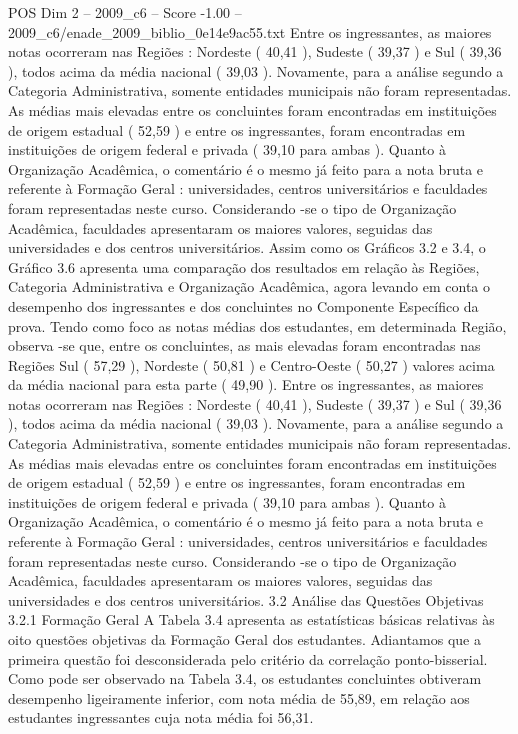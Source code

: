 \begin{textsample}{POS Dim 2 – 2009\_c6 – Score -1.00 – 2009\_c6/enade\_2009\_biblio\_0e14e9ac55.txt}
Entre os ingressantes, as maiores notas ocorreram nas Regiões : Nordeste ( 40,41 ), Sudeste ( 39,37 ) e Sul ( 39,36 ), todos acima da média nacional ( 39,03 ).
Novamente, para a análise segundo a Categoria Administrativa, somente entidades municipais não foram representadas.
As médias mais elevadas entre os concluintes foram encontradas em instituições de origem estadual ( 52,59 ) e entre os ingressantes, foram encontradas em instituições de origem federal e privada ( 39,10 para ambas ).
Quanto à Organização Acadêmica, o comentário é o mesmo já feito para a nota bruta e referente à Formação Geral : universidades, centros universitários e faculdades foram representadas neste curso.
Considerando -se o tipo de Organização Acadêmica, faculdades apresentaram os maiores valores, seguidas das universidades e dos centros universitários.
Assim como os Gráficos 3.2 e 3.4, o Gráfico 3.6 apresenta uma comparação dos resultados em relação às Regiões, Categoria Administrativa e Organização Acadêmica, agora levando em conta o desempenho dos ingressantes e dos concluintes no Componente Específico da prova.
Tendo como foco as notas médias dos estudantes, em determinada Região, observa -se que, entre os concluintes, as mais elevadas foram encontradas nas Regiões Sul ( 57,29 ), Nordeste ( 50,81 ) e Centro-Oeste ( 50,27 ) valores acima da média nacional para esta parte ( 49,90 ).
Entre os ingressantes, as maiores notas ocorreram nas Regiões : Nordeste ( 40,41 ), Sudeste ( 39,37 ) e Sul ( 39,36 ), todos acima da média nacional ( 39,03 ).
Novamente, para a análise segundo a Categoria Administrativa, somente entidades municipais não foram representadas.
As médias mais elevadas entre os concluintes foram encontradas em instituições de origem estadual ( 52,59 ) e entre os ingressantes, foram encontradas em instituições de origem federal e privada ( 39,10 para ambas ).
Quanto à Organização Acadêmica, o comentário é o mesmo já feito para a nota bruta e referente à Formação Geral : universidades, centros universitários e faculdades foram representadas neste curso.
Considerando -se o tipo de Organização Acadêmica, faculdades apresentaram os maiores valores, seguidas das universidades e dos centros universitários. 3.2 Análise das Questões Objetivas 3.2.1 Formação Geral A Tabela 3.4 apresenta as estatísticas básicas relativas às oito questões objetivas da Formação Geral dos estudantes.
Adiantamos que a primeira questão foi desconsiderada pelo critério da correlação ponto-bisserial.
Como pode ser observado na Tabela 3.4, os estudantes concluintes obtiveram desempenho ligeiramente inferior, com nota média de 55,89, em relação aos estudantes ingressantes cuja nota média foi 56,31.

\end{textsample}
